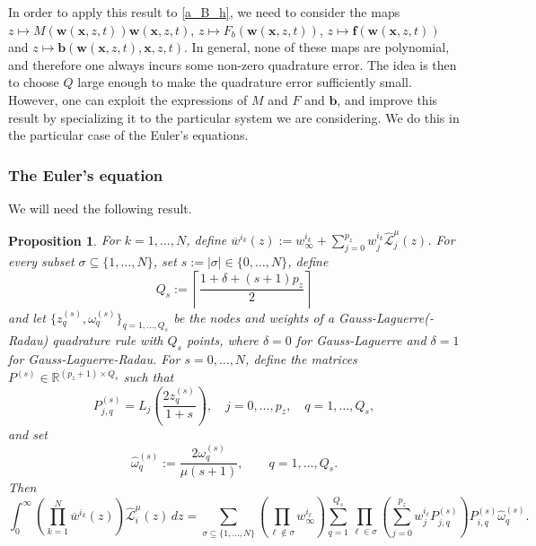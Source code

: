 \documentclass{article}
\newcommand{\Rbb}{\mathbb{R}}
\newcommand{\wbf}{\mathbf{w}}
\newcommand{\bbf}{\mathbf{b}}
\newcommand{\xbf}{\mathbf{x}}
\newcommand{\fbf}{\mathbf{f}}
\newcommand{\cLh}{\hat{\mathscr{L}}}
\newtheorem{proposition}[theorem]{Proposition}
\begin{document}
	In order to apply this result to \eqref{a_B_h}, we need to consider the maps $z\mapsto M(\wbf(\xbf,z,t))\wbf(\xbf,z,t)$, $z\mapsto F_b(\wbf(\xbf,z,t))$, $z\mapsto \fbf(\wbf(\xbf,z,t))$ and $z\mapsto \bbf(\wbf(\xbf,z,t),\xbf,z,t)$. In general, none of these maps are polynomial, and therefore one always incurs some non-zero quadrature error. The idea is then to choose $Q$ large enough to make the quadrature error sufficiently small. However, one can exploit the expressions of $M$ and $F$ and $\bbf$, and improve this result by specializing it to the particular system we are considering. We do this in the particular case of the Euler's equations.
	
	\subsubsection*{The Euler's equation}
	We will need the following result.
	\begin{proposition}\label{prop:integral_euler}
		For $k=1,\dots,N$, define $\overline{w}^{i_k}(z):=w^{i_k}_\infty+\sum_{j=0}^{p_z}w_j^{i_k}\cLh_j^\mu(z)$. For every subset $\sigma\subseteq\{1,\dots,N\}$, set $s:=\lvert\sigma\rvert\in\{0,\dots,N\}$, define
		\begin{equation*}
			Q_{s} :=\left\lceil\frac{1+\delta+(s+1)p_z}{2}\right\rceil
		\end{equation*}
		and let $\{z_q^{(s)},\omega_q^{(s)}\}_{q=1,\dots,Q_{s}}$ be the nodes and weights of a Gauss-Laguerre(-Radau) quadrature rule with $Q_{s}$ points, where $\delta=0$ for Gauss-Laguerre and $\delta=1$ for Gauss-Laguerre-Radau. For $s=0,\dots,N$, define the matrices $P^{(s)}\in\Rbb^{(p_z+1)\times Q_{s}}$ such that
		\begin{equation*}
			P^{(s)}_{j,q}=L_{j}\left(\frac{2z_q^{(s)}}{1+s}\right), \quad j=0,\dots,p_z, \quad q=1,\dots,Q_{s},
		\end{equation*}
		and set
		\begin{equation*}
			\widehat{\omega}_q^{(s)} := \frac{2\omega_q^{(s)}}{\mu(s+1)}, \qquad q=1,\dots,Q_{s}.
		\end{equation*}
		Then
		\begin{equation}\label{integral_L}
			\int_0^\infty\left(\prod_{k=1}^N\overline{w}^{i_k}(z)\right)\cLh_i^\mu(z)\,dz=\sum_{\sigma\subseteq\{1,\dots,N\}}\left(\prod_{\ell\notin\sigma}w_\infty^{i_\ell}\right)\sum_{q=1}^{Q_{s}}\prod_{\ell\in\sigma}\left(\sum_{j=0}^{p_z}w_j^{i_\ell}P^{(s)}_{j,q}\right)P^{(s)}_{i,q}\widehat\omega_q^{(s)}.
		\end{equation}
	\end{proposition}
\end{document}
